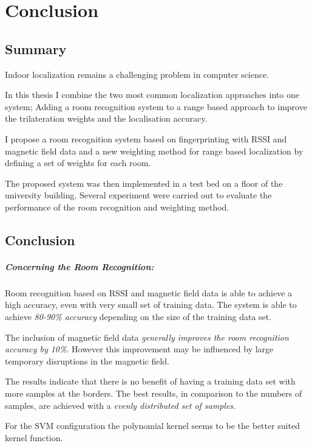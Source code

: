 \chapter{Conclusion}

\label{Chapter6}

\section{Summary}


Indoor localization remains a challenging problem in computer science.

In this thesis I combine the two most common localization approaches into one system; Adding a room recognition system to a range based approach to improve the trilateration weights and the localisation accuracy.

I propose a room recognition system based on fingerprinting with RSSI and magnetic field data and a new weighting method for range based localization by defining a set of weights for each room.

The proposed system was then implemented in a test bed on a floor of the university building. Several experiment were carried out to evaluate the performance of the room recognition and weighting method.

\section{Conclusion}

\paragraph{Concerning the Room Recognition:}
Room recognition based on RSSI and magnetic field data is able to achieve a high accuracy, even with very small set of training data. The system is able to achieve \emph{80-90\% accuracy} depending on the size of the training data set.

The inclusion of magnetic field data \emph{generally improves the room recognition accuracy by 10\%}. However this improvement may be influenced by large temporary disruptions in the magnetic field.

The results indicate that there is no benefit of having a training data set with more samples at the borders. The best results, in comparison to the numbers of samples, are achieved with a \emph{evenly distributed set of samples}. 
 
For the SVM configuration the polynomial kernel seems to be the better suited kernel function.


